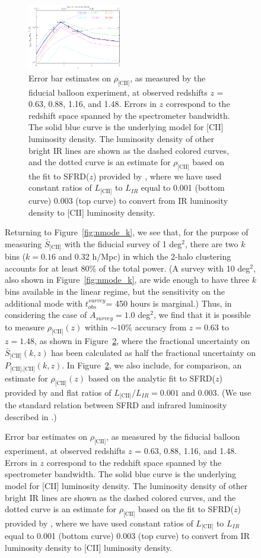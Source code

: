 \documentclass[iop,twocolappendix]{emulateapj}
\begin{document}
\begin{figure}[t]
\begin{figure}[b]
\centering
\includegraphics[width=0.45\textwidth]{s_cii_balloon_1sqdeg_450hr}
\caption{Error bar estimates on $\rho_{\textrm{[CII]}}$, as measured by the fiducial balloon experiment, at observed redshifts $z$ = 0.63, 0.88, 1.16, and 1.48. Errors in $z$ correspond to the redshift space spanned by the spectrometer bandwidth. The solid blue curve is the underlying model for [CII] luminosity density. The luminosity density of other bright IR lines are shown as the dashed colored curves, and the dotted curve is an estimate for $\rho_{\textrm{[CII]}}$ based on the fit to SFRD($z$) provided by \citet{hb06}, where we have used constant ratios of $L_{\textrm{[CII]}}$ to $L_{IR}$ equal to 0.001 (bottom curve) 0.003 (top curve) to convert from IR luminosity density to [CII] luminosity density.}
\label{fig:scii_z}
\end{figure}

Returning to Figure~\ref{fig:nmode_k}, we see that, for the purpose of measuring $\bar{S}_{\textrm{[CII]}}$ with the fiducial survey of 1 deg$^2$, there are two $k$ bins ($k = 0.16$ and 0.32 h/Mpc) in which the 2-halo clustering accounts for at least 80\% of the total power. (A survey with 10 deg$^2$, also shown in Figure~\ref{fig:nmode_k}, are wide enough to have three $k$ bins available in the linear regime, but the sensitivity on the additional mode with $t_{obs}^{survey}$= 450 hours is marginal.) Thus, in considering the case of $A_{survey} = 1.0$ deg$^2$, we find that it is possible to measure $\rho_{\textrm{[CII]}}(z)$ within $\sim10\%$ accuracy from $z = 0.63$ to $z=1.48$, as shown in Figure~\ref{fig:scii_z}, where the fractional uncertainty on $\bar{S}_{\textrm{[CII]}}(k,z)$ has been calculated as half the fractional uncertainty on $P_{\textrm{[CII],[CII]}}(k,z)$. In Figure~\ref{fig:scii_z}, we also include, for comparison, an estimate for $\rho_{\textrm{[CII]}}(z)$ based on the analytic fit to SFRD($z$) provided by \citet{hb06} and flat ratios of $L_{\textrm{[CII]}}/L_{IR} = 0.001$ and 0.003. (We use the standard relation between SFRD and infrared luminosity described in \citet{kennicutt98}.)


\end{figure}
\end{document}
